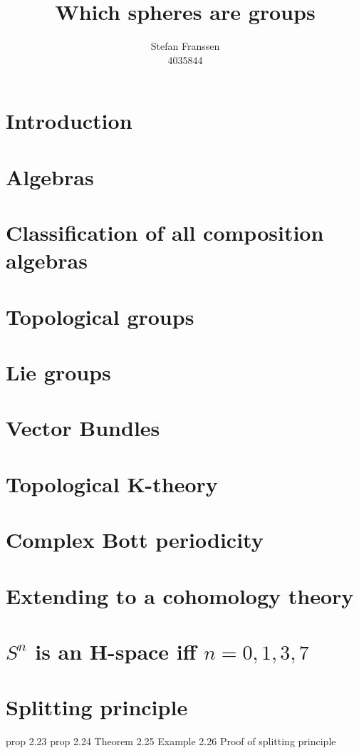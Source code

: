 \documentclass{report}
\title{Which spheres are groups}
\author{Stefan Franssen \\4035844}
\begin{document}
\maketitle
\tableofcontents{}
\chapter{Introduction}

\chapter{Algebras}

\chapter{Classification of all composition algebras}

\chapter{Topological groups}

\chapter{Lie groups}

\chapter{Vector Bundles}

\chapter{Topological K-theory}

\chapter{Complex Bott periodicity}

\chapter{Extending to a cohomology theory}

\chapter{$S^n$ is an H-space iff $n = 0,1,3,7$}


\iffalse
\chapter{Splitting principle}
prop 2.23
prop 2.24
Theorem 2.25
Example 2.26
Proof of splitting principle
\end{document}

